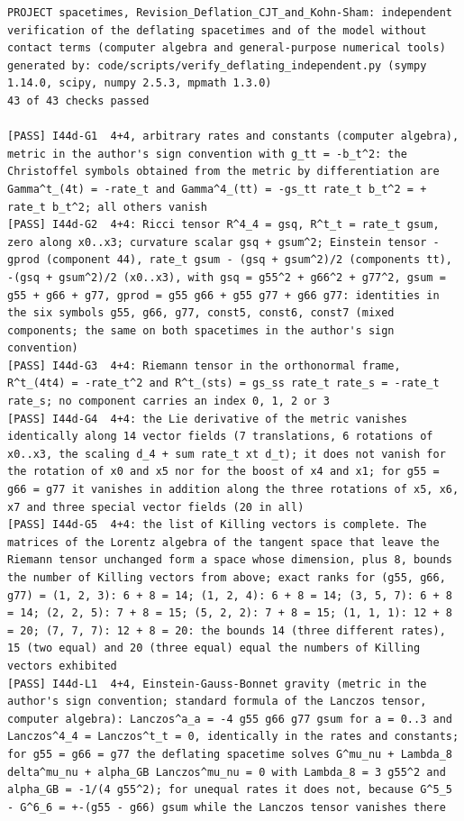 \documentclass[
  10pt,
]{article}
\begin{document}
\begin{verbatim}
PROJECT spacetimes, Revision_Deflation_CJT_and_Kohn-Sham: independent verification of the deflating spacetimes and of the model without contact terms (computer algebra and general-purpose numerical tools)
generated by: code/scripts/verify_deflating_independent.py (sympy 1.14.0, scipy, numpy 2.5.3, mpmath 1.3.0)
43 of 43 checks passed

[PASS] I44d-G1  4+4, arbitrary rates and constants (computer algebra), metric in the author's sign convention with g_tt = -b_t^2: the Christoffel symbols obtained from the metric by differentiation are Gamma^t_(4t) = -rate_t and Gamma^4_(tt) = -gs_tt rate_t b_t^2 = + rate_t b_t^2; all others vanish
[PASS] I44d-G2  4+4: Ricci tensor R^4_4 = gsq, R^t_t = rate_t gsum, zero along x0..x3; curvature scalar gsq + gsum^2; Einstein tensor -gprod (component 44), rate_t gsum - (gsq + gsum^2)/2 (components tt), -(gsq + gsum^2)/2 (x0..x3), with gsq = g55^2 + g66^2 + g77^2, gsum = g55 + g66 + g77, gprod = g55 g66 + g55 g77 + g66 g77: identities in the six symbols g55, g66, g77, const5, const6, const7 (mixed components; the same on both spacetimes in the author's sign convention)
[PASS] I44d-G3  4+4: Riemann tensor in the orthonormal frame, R^t_(4t4) = -rate_t^2 and R^t_(sts) = gs_ss rate_t rate_s = -rate_t rate_s; no component carries an index 0, 1, 2 or 3
[PASS] I44d-G4  4+4: the Lie derivative of the metric vanishes identically along 14 vector fields (7 translations, 6 rotations of x0..x3, the scaling d_4 + sum rate_t xt d_t); it does not vanish for the rotation of x0 and x5 nor for the boost of x4 and x1; for g55 = g66 = g77 it vanishes in addition along the three rotations of x5, x6, x7 and three special vector fields (20 in all)
[PASS] I44d-G5  4+4: the list of Killing vectors is complete. The matrices of the Lorentz algebra of the tangent space that leave the Riemann tensor unchanged form a space whose dimension, plus 8, bounds the number of Killing vectors from above; exact ranks for (g55, g66, g77) = (1, 2, 3): 6 + 8 = 14; (1, 2, 4): 6 + 8 = 14; (3, 5, 7): 6 + 8 = 14; (2, 2, 5): 7 + 8 = 15; (5, 2, 2): 7 + 8 = 15; (1, 1, 1): 12 + 8 = 20; (7, 7, 7): 12 + 8 = 20: the bounds 14 (three different rates), 15 (two equal) and 20 (three equal) equal the numbers of Killing vectors exhibited
[PASS] I44d-L1  4+4, Einstein-Gauss-Bonnet gravity (metric in the author's sign convention; standard formula of the Lanczos tensor, computer algebra): Lanczos^a_a = -4 g55 g66 g77 gsum for a = 0..3 and Lanczos^4_4 = Lanczos^t_t = 0, identically in the rates and constants; for g55 = g66 = g77 the deflating spacetime solves G^mu_nu + Lambda_8 delta^mu_nu + alpha_GB Lanczos^mu_nu = 0 with Lambda_8 = 3 g55^2 and alpha_GB = -1/(4 g55^2); for unequal rates it does not, because G^5_5 - G^6_6 = +-(g55 - g66) gsum while the Lanczos tensor vanishes there

\end{verbatim}
\end{document}
